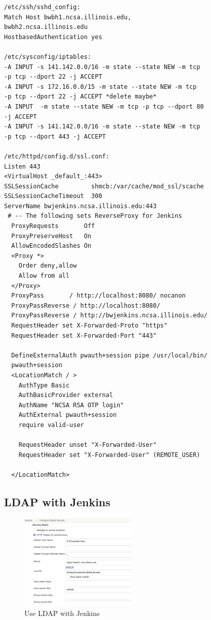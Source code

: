 \documentclass[10pt, conference, compsocconf]{IEEEtran}
\begin{document}
\begin{lstlisting}
/etc/ssh/sshd_config:
Match Host bwbh1.ncsa.illinois.edu,
bwbh2.ncsa.illinois.edu
HostbasedAuthentication yes

/etc/sysconfig/iptables:
-A INPUT -s 141.142.0.0/16 -m state --state NEW -m tcp 
-p tcp --dport 22 -j ACCEPT
-A INPUT -s 172.16.0.0/15 -m state --state NEW -m tcp 
-p tcp --dport 22 -j ACCEPT *delete maybe*
-A INPUT  -m state --state NEW -m tcp -p tcp --dport 80 
-j ACCEPT
-A INPUT -s 141.142.0.0/16 -m state --state NEW -m tcp 
-p tcp --dport 443 -j ACCEPT

/etc/httpd/config.d/ssl.conf:
Listen 443
<VirtualHost _default_:443>
SSLSessionCache         shmcb:/var/cache/mod_ssl/scache
SSLSessionCacheTimeout  300
ServerName bwjenkins.ncsa.illinois.edu:443
 # -- The following sets ReverseProxy for Jenkins
  ProxyRequests       Off
  ProxyPreserveHost   On
  AllowEncodedSlashes On
  <Proxy *>
    Order deny,allow
    Allow from all
  </Proxy>
  ProxyPass       / http://localhost:8080/ nocanon
  ProxyPassReverse / http://localhost:8080/
  ProxyPassReverse / http://bwjenkins.ncsa.illinois.edu/
  RequestHeader set X-Forwarded-Proto "https"
  RequestHeader set X-Forwarded-Port "443"

  DefineExternalAuth pwauth+session pipe /usr/local/bin/
  pwauth+session
  <LocationMatch / > 
    AuthType Basic
    AuthBasicProvider external
    AuthName "NCSA RSA OTP login" 
    AuthExternal pwauth+session
    require valid-user
    
    RequestHeader unset "X-Forwarded-User"
    RequestHeader set "X-Forwarded-User" (REMOTE_USER)

  </LocationMatch>
\end{lstlisting}

\subsection{LDAP with Jenkins}

\begin{figure}[H]
\centering
\includegraphics[width=0.5\textwidth]{LDAP-Jenkins}
\caption{ Use LDAP with Jenkins }
\label{fig:LDAP-Jenkins}
\end{figure}
\end{document}
